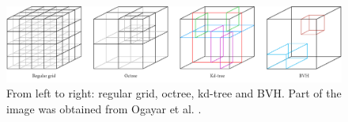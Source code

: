 \begin{figure}[ht]
	\includegraphics[width=\linewidth]{figs/fundamentals/data_structures.png}
	\caption{From left to right: regular grid, octree, kd-tree and BVH. Part of the image was obtained from Ogayar et al. \cite{ogayar-anguita_nested_2023}. }
    \label{fig:data_structures_indexing}
\end{figure}